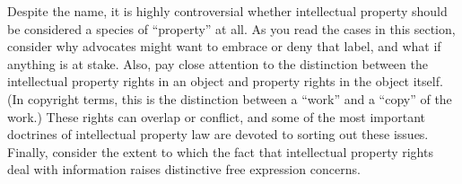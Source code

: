 Despite the name, it is highly controversial whether intellectual property
should be considered a species of ``property'' at all. As you read the cases in
this section, consider why advocates might want to embrace or deny that label,
and what if anything is at stake. Also, pay close attention to the distinction
between the intellectual property rights in an object and property rights in
the object itself. (In copyright terms, this is the distinction between a
``work'' and a ``copy'' of the work.) These rights can overlap or conflict, and
some of the most important doctrines of intellectual property law are devoted
to sorting out these issues. Finally, consider the extent to which the fact
that intellectual property rights deal with information raises distinctive free
expression concerns.

